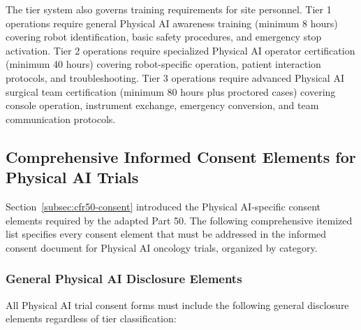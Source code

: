 The tier system also governs training requirements for site personnel. Tier 1
operations require general Physical AI awareness training (minimum 8 hours)
covering robot identification, basic safety procedures, and emergency stop
activation. Tier 2 operations require specialized Physical AI operator
certification (minimum 40 hours) covering robot-specific operation, patient
interaction protocols, and troubleshooting. Tier 3 operations require advanced
Physical AI surgical team certification (minimum 80 hours plus proctored cases)
covering console operation, instrument exchange, emergency conversion, and
team communication protocols.

\subsection{Comprehensive Informed Consent Elements for Physical AI Trials}
\label{subsec:cfr50-consent-comprehensive}

Section~\ref{subsec:cfr50-consent} introduced the Physical AI-specific consent
elements required by the adapted Part 50. The following comprehensive itemized
list specifies every consent element that must be addressed in the informed
consent document for Physical AI oncology trials, organized by category.

\subsubsection{General Physical AI Disclosure Elements}

All Physical AI trial consent forms must include the following general
disclosure elements regardless of tier classification:

